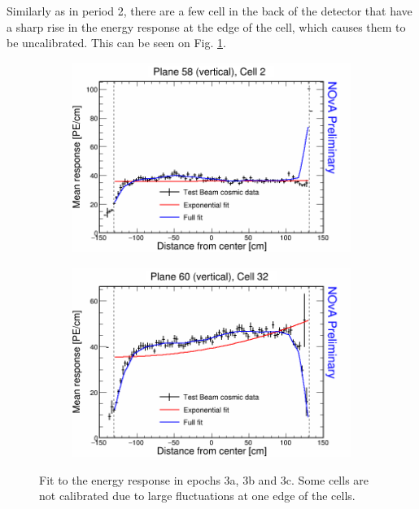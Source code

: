 Similarly as in period 2, there are a few cell in the back of the detector that have a sharp rise in the energy response at the edge of the cell, which causes them to be uncalibrated. This can be seen on Fig. \ref{fig:AttenfitResultsEpoch3abc_CellEdges}.

\begin{figure}[h]
  \begin{subfigure}{0.5\textwidth}
    \includegraphics[width=\linewidth]{RelativeCalibrationResults/ep3abc_058_002.png}
  \end{subfigure}
  \begin{subfigure}{0.5\textwidth}
    \includegraphics[width=\linewidth]{RelativeCalibrationResults/ep3abc_060_032.png}
  \end{subfigure}
  \caption{Fit to the energy response in epochs 3a, 3b and 3c. Some cells are not calibrated due to large fluctuations at one edge of the cells.}
  \label{fig:AttenfitResultsEpoch3abc_CellEdges}
\end{figure}


